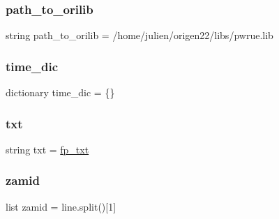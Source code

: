 \subsubsection{\texorpdfstring{path\+\_\+to\+\_\+orilib}{path\_to\_orilib}}
{\footnotesize\ttfamily string path\+\_\+to\+\_\+orilib = \textquotesingle{}/home/julien/origen22/libs/pwrue.\+lib\textquotesingle{}}

\mbox{\label{namespaceconv__fylib_aa41c6cd0c7b7ba06cd598f2cdacecf28}} 
\subsubsection{\texorpdfstring{time\+\_\+dic}{time\_dic}}
{\footnotesize\ttfamily dictionary time\+\_\+dic = \{\}}

\mbox{\label{namespaceconv__fylib_af306301328dca1eed4e07dc5350e8569}} 
\subsubsection{\texorpdfstring{txt}{txt}}
{\footnotesize\ttfamily string txt = \mbox{\hyperlink{namespaceconv__fylib_abcdb1a110e2a54bac4567f258e4e314f}{fp\+\_\+txt}}}

\mbox{\label{namespaceconv__fylib_af70f0d4a2383a49278fdbcb77d9c5075}} 
\subsubsection{\texorpdfstring{zamid}{zamid}}
{\footnotesize\ttfamily list zamid = line.\+split()\mbox{[}1\mbox{]}}

